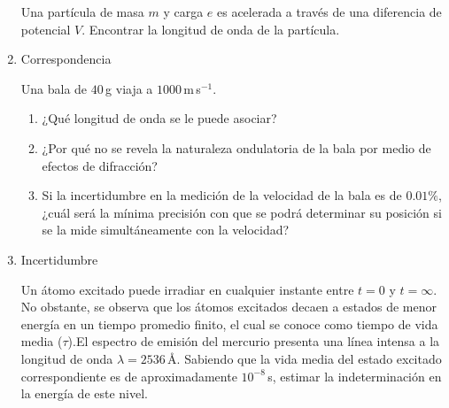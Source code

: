 \documentclass[a4paper,12pt]{article}
\begin{document}
\begin{enumerate}
Una partícula de masa $m$ y carga $e$ es acelerada a través de una diferencia
de potencial $V$.  Encontrar la longitud de onda de la partícula. 

\item {Correspondencia}

Una bala de $40$\,g viaja a $1000$\,m\,s$^{-1}$. 

\begin{enumerate}
\item ¿Qué longitud de onda se le puede asociar? 
\item ¿Por qué no se revela la naturaleza ondulatoria de la bala por medio de
efectos de difracción? 
\item Si la incertidumbre en la medición de la velocidad de la bala es de
$0.01\%$, ¿cuál será la mínima precisión con que se podrá determinar su
posición si se la mide simultáneamente con la velocidad?
\end{enumerate}

\item {Incertidumbre}

Un átomo excitado puede irradiar en cualquier instante entre $t = 0$ y $t =
\infty$. No obstante, se observa que los átomos excitados decaen a estados de
menor energía en un tiempo promedio finito, el cual se conoce como tiempo de
vida media ($\tau$).El espectro de emisión del mercurio presenta una línea
intensa a la longitud de onda $\lambda =2536$\,\AA. Sabiendo que la vida media
del estado excitado correspondiente es de aproximadamente $10^{-8}$\,s, estimar
la indeterminación en la energía de este nivel.
\end{enumerate}
\end{document}
